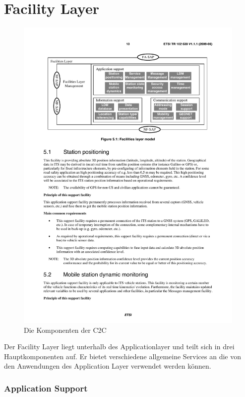 \chapter{Facility Layer \label{chap:facilitylayer}}
\begin{figure}[htbp]
\includegraphics[width=0.99\textwidth]{content/images/04_facilitylayer/facility_layer_model.pdf}
\caption{Die Komponenten der \acl{C2C}}
\label{fig:komponentenderc2x}
\end{figure}
Der Facility Layer liegt unterhalb des Applicationlayer und teilt sich in drei Hauptkomponenten auf. Er bietet verschiedene allgemeine Services an die von den Anwendungen des Application Layer verwendet werden können.
\subsection{Application Support}

